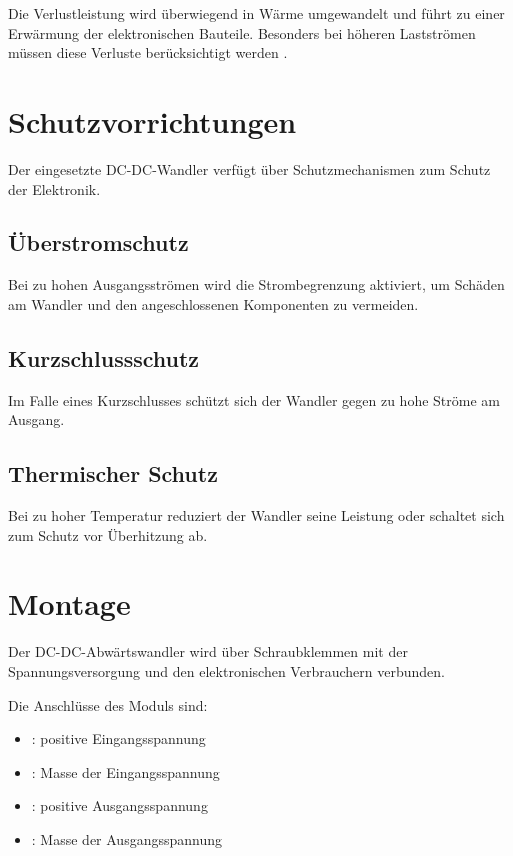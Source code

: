 Die Verlustleistung wird überwiegend in Wärme umgewandelt und führt zu einer Erwärmung der elektronischen Bauteile. 
Besonders bei höheren Lastströmen müssen diese Verluste berücksichtigt werden \cite{Schlienz:2020}.

\section{Schutzvorrichtungen}

Der eingesetzte DC-DC-Wandler verfügt über Schutzmechanismen zum Schutz der Elektronik.

\subsection{Überstromschutz}

Bei zu hohen Ausgangsströmen wird die Strombegrenzung aktiviert, um Schäden am Wandler und den angeschlossenen Komponenten zu vermeiden.

\subsection{Kurzschlussschutz}

Im Falle eines Kurzschlusses schützt sich der Wandler gegen zu hohe Ströme am Ausgang.

\subsection{Thermischer Schutz}

Bei zu hoher Temperatur reduziert der Wandler seine Leistung oder schaltet sich zum Schutz vor Überhitzung ab.

\section{Montage}

Der DC-DC-Abwärtswandler wird über Schraubklemmen mit der Spannungsversorgung und den elektronischen Verbrauchern verbunden.

Die Anschlüsse des Moduls sind:

\begin{itemize}
	\item {}: positive Eingangsspannung
	\item {}: Masse der Eingangsspannung
	\item {}: positive Ausgangsspannung
	\item {}: Masse der Ausgangsspannung
\end{itemize}

